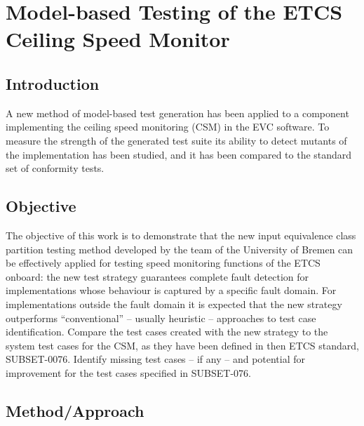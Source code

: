 

\chapter{Model-based Testing  of the ETCS Ceiling Speed Monitor}
\label{cha:csmunibremen}

\section{Introduction}
 
A new method of model-based test generation has been applied to a
component implementing the ceiling speed monitoring (CSM) in the EVC
software. To measure the strength of the generated test suite
its ability to detect mutants of the implementation has been studied,
and it has been compared to the standard set of conformity tests.


\section{Objective}

The objective of this work is to demonstrate that the new input equivalence class partition testing method
developed by the team of the University of Bremen can be effectively applied for 
testing speed monitoring functions of the ETCS onboard: the new test strategy 
guarantees complete fault detection for implementations whose behaviour is captured
by a specific fault domain. For implementations outside the fault domain it is expected that the new strategy outperforms ``conventional'' -- usually heuristic -- approaches to test case identification. Compare the test cases created with the new strategy to
the system test cases for the CSM, as they have been defined in then ETCS standard,
SUBSET-0076. Identify missing test cases -- if any -- and potential for improvement for 
the test cases specified in SUBSET-076.


\section{Method/Approach}

